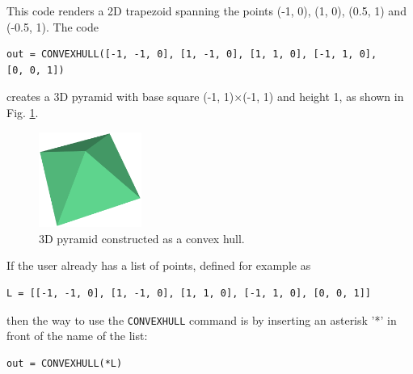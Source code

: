 \noindent
This code renders a 2D trapezoid spanning the points (-1, 0), (1, 0), (0.5, 1) and 
(-0.5, 1). The code\\

\begin{bbox}
\begin{verbatim}
out = CONVEXHULL([-1, -1, 0], [1, -1, 0], [1, 1, 0], [-1, 1, 0], 
[0, 0, 1])
\end{verbatim}
\end{bbox}
\vspace{6mm}

\noindent
creates a 3D pyramid with base square (-1, 1)$\times$(-1, 1) and height 1,
as shown in Fig. \ref{fig:pyra}. 

\begin{figure}[!ht]
\begin{center}
\includegraphics[width=0.3\textwidth]{img/pyra.png}
\end{center}
\vspace{-4mm}
\caption{3D pyramid constructed as a convex hull.}
\label{fig:pyra}
\end{figure}
\noindent
If the user already has a list of points, defined for example as\\

\begin{bbox}
\begin{verbatim}
L = [[-1, -1, 0], [1, -1, 0], [1, 1, 0], [-1, 1, 0], [0, 0, 1]]
\end{verbatim}
\end{bbox}
\vspace{6mm}

\noindent
then the way to use the {\tt CONVEXHULL} command is by inserting 
an asterisk '*' in front of the name of the list: \\

\begin{bbox}
\begin{verbatim}
out = CONVEXHULL(*L)
\end{verbatim}
\end{bbox}
\vspace{6mm}


